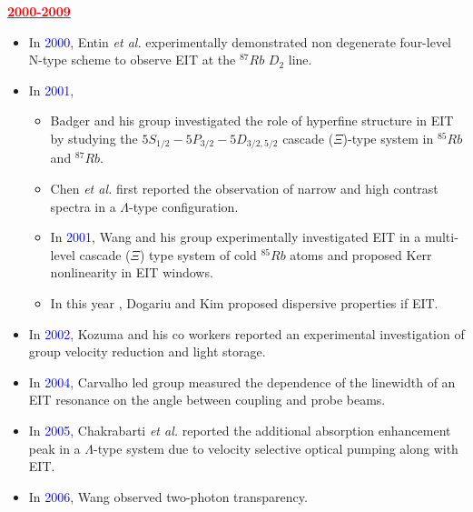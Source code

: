 \documentclass[9pt,aspectratio94]{beamer}
\begin{document}
    \begin{frame}
    \begin{center}
        \textcolor{red}{\underline{\textbf{2000-2009}}}
    \end{center}
    \begin{itemize}
\item In \textcolor{blue}{2000}, Entin \textit{et al.} experimentally demonstrated non degenerate four-level N-type scheme to observe EIT at the $^{87}Rb$ $D_{2}$ line.
\item In \textcolor{blue}{2001},
\begin{itemize}
    \item Badger and his group investigated the role of hyperfine structure in EIT by studying the $5S_{1/2} - 5P_{3/2} - 5D_{3/2,5/2}$ cascade ($\Xi$)-type system in $^{85}Rb$ and $^{87}Rb$.
    \item Chen \textit{et al.} first reported the observation of narrow and high contrast spectra in a $\Lambda$-type configuration.
    \item In \textcolor{blue}{2001}, Wang  and his group experimentally investigated EIT in a multi-level cascade ($\Xi$) type system of cold $^{85}Rb$ atoms and proposed Kerr nonlinearity in EIT windows.
 
   \item In this year , Dogariu and Kim proposed dispersive properties if EIT.
   \end{itemize}

\item In \textcolor{blue}{2002}, Kozuma and his co workers reported an experimental investigation of group velocity reduction and light storage.
\end{itemize}
\end{frame}

\begin{frame}
\begin{itemize}
\item In \textcolor{blue}{2004},  Carvalho led group measured the dependence of the linewidth of an EIT resonance on the angle between coupling and probe beams.

\item In \textcolor{blue}{2005}, Chakrabarti \textit{et al.} reported the additional absorption enhancement peak in a $\Lambda$-type system due to velocity selective optical pumping along with EIT.
\item In \textcolor{blue}{2006}, Wang observed two-photon transparency.
\end{itemize}
\end{frame}
\end{document}
